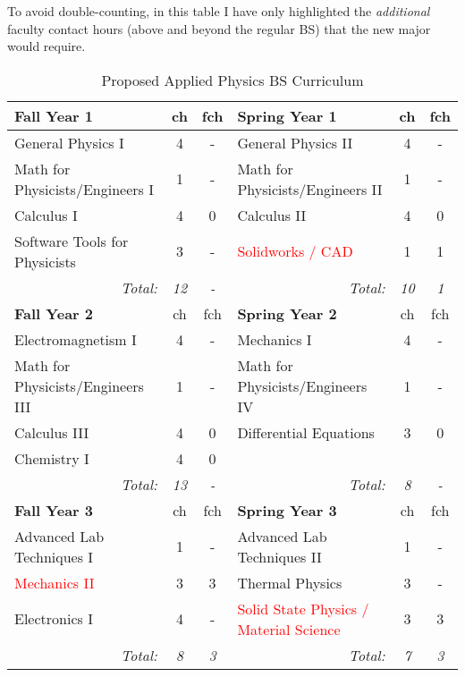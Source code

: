 \documentclass[12pt,preprint]{aastex}
\newcommand{\red}[1]{\textcolor{red}{#1}}
\begin{document}
To avoid double-counting, in this table I have only highlighted the
\emph{additional} faculty contact hours (above and beyond the regular BS) that
the new major would require.

\begin{longtable}{lcclcc}
\caption{Proposed Applied Physics BS Curriculum}\label{table:applied} \\
\hline
{\bf Fall Year 1} & {\sc ch} & {\sc fch} & {\bf Spring Year 1} & {\sc ch} & {\sc fch}  \\ 
\hline
\hline
General Physics I                        & 4 & - & General Physics II & 4 & - \\
Math for Physicists/Engineers I          & 1 & - & Math for Physicists/Engineers II & 1 & -  \\ 
Calculus I                               & 4 & 0 & Calculus II & 4 & 0 \\
Software Tools for Physicists            & 3 & - & \red{Solidworks / CAD} & 1 & 1 \\ 
\multicolumn{1}{r}{\emph{Total:}} & \emph{12} & \emph{-} &
\multicolumn{1}{r}{\emph{Total:}} & \emph{10}  & \emph{1} \\

\hline
{\bf Fall Year 2} & {\sc ch} & {\sc fch} & {\bf Spring Year 2} & {\sc ch} & {\sc fch} \\ 
\hline
\hline
Electromagnetism I                & 4 & - & Mechanics I                      & 4 & - \\
Math for Physicists/Engineers III & 1 & - & Math for Physicists/Engineers IV & 1 & - \\ 
Calculus III                      & 4 & 0 & Differential Equations           & 3 & 0 \\
Chemistry I                       & 4 & 0 &                                  &   &  \\
\multicolumn{1}{r}{\emph{Total:}} & \emph{13} & \emph{-} &
\multicolumn{1}{r}{\emph{Total:}} & \emph{8} & \emph{-} \\

\hline
{\bf Fall Year 3} & {\sc ch} & {\sc fch} & {\bf Spring Year 3} & {\sc ch} & {\sc fch}  \\ 
\hline
\hline
Advanced Lab Techniques I  & 1 & - & Advanced Lab Techniques II & 1 & - \\
\red{Mechanics II}         & 3 & 3 & Thermal Physics            & 3 & - \\
Electronics I              & 4 & - & \red{Solid State Physics / Material Science} & 3 & 3 \\ 
\multicolumn{1}{r}{\emph{Total:}} & \emph{8} & \emph{3} &
\multicolumn{1}{r}{\emph{Total:}} & \emph{7} & \emph{3} \\


\end{longtable}
\end{document}
